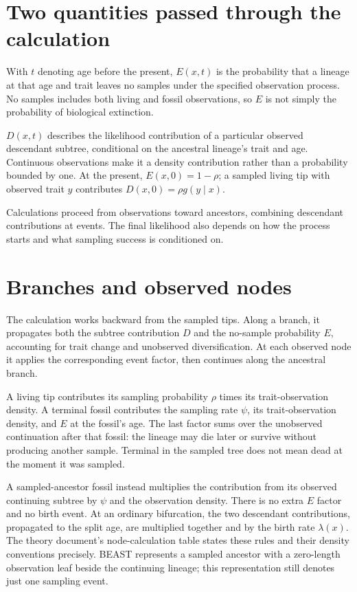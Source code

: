 \documentclass[11pt]{article}
\begin{document}
\section{Two quantities passed through the calculation}
With $t$ denoting age before the present, $E(x,t)$ is the probability that a lineage at that age and
trait leaves no samples under the specified observation process. No samples includes both living
and fossil observations, so $E$ is not simply the probability of biological extinction.

$D(x,t)$ describes the likelihood contribution of a particular observed descendant subtree,
conditional on the ancestral lineage's trait and age. Continuous observations make it a density
contribution rather than a probability bounded by one. At the present, $E(x,0)=1-\rho$; a sampled
living tip with observed trait $y$ contributes $D(x,0)=\rho g(y\mid x)$.

Calculations proceed from observations toward ancestors, combining descendant contributions at
events. The final likelihood also depends on how the process starts and what sampling success is
conditioned on.

\section{Branches and observed nodes}
The calculation works backward from the sampled tips. Along a branch, it propagates both the
subtree contribution $D$ and the no-sample probability $E$, accounting for trait change and
unobserved diversification. At each observed node it applies the corresponding event factor,
then continues along the ancestral branch.

A living tip contributes its sampling probability $\rho$ times its trait-observation density.
A terminal fossil contributes the sampling rate $\psi$, its trait-observation density, and $E$
at the fossil's age. The last factor sums over the unobserved continuation after that fossil:
the lineage may die later or survive without producing another sample. Terminal in the
sampled tree does not mean dead at the moment it was sampled.

A sampled-ancestor fossil instead multiplies the contribution from its observed continuing
subtree by $\psi$ and the observation density. There is no extra $E$ factor and no birth event.
At an ordinary bifurcation, the two descendant contributions, propagated to the split age,
are multiplied together and by the birth rate $\lambda(x)$. The theory document's
node-calculation table states these rules and their density conventions precisely.
BEAST represents a sampled ancestor with a zero-length observation leaf beside the continuing
lineage; this representation still denotes just one sampling event.
\end{document}

